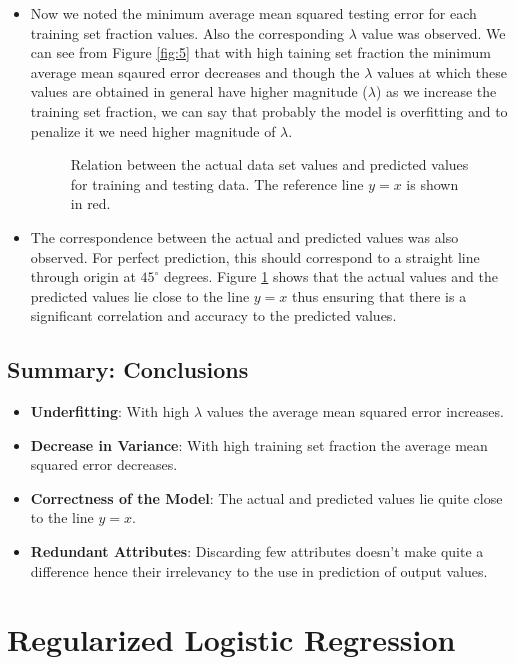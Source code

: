 \documentclass{article}
\begin{document}
\begin{itemize}
\item Now we noted the minimum average mean squared testing error for each training set fraction values. Also the corresponding $\lambda$ value was observed. We can see from Figure \ref{fig:5} that with high taining set fraction the minimum average mean sqaured error decreases and though the $\lambda$ values at which these values are obtained  in general have higher magnitude ($\lambda$) as we increase the training set fraction, we can say that probably the model is overfitting and to penalize it we need higher magnitude of $\lambda$.

\begin{figure}[H]
 \caption{Relation between the actual data set values and predicted values for training and testing data. The reference line $y=x$ is shown in red.}
 \label{fig:6}
 \end{figure}
 
\item The correspondence between the actual and predicted values was also observed. For perfect prediction, this should correspond to a straight line through origin at $45^\circ$ degrees. Figure \ref{fig:6} shows that the actual values and the predicted values lie close to the line $y=x$ thus ensuring that there is a significant correlation and accuracy to the predicted values.
 
\end{itemize}

\subsection*{Summary: Conclusions}
\begin{itemize}
\item {\bf Underfitting}: With high $\lambda$ values the average mean squared error increases.
\item {\bf Decrease in Variance}: With high training set fraction the average mean squared error decreases.
\item {\bf Correctness of the Model}: The actual and predicted values lie quite close to the line $y=x$.
\item {\bf Redundant Attributes}: Discarding few attributes doesn't make quite a difference hence their irrelevancy to the use in prediction of output values.
\end{itemize}

\section{Regularized Logistic Regression}
\end{document}
